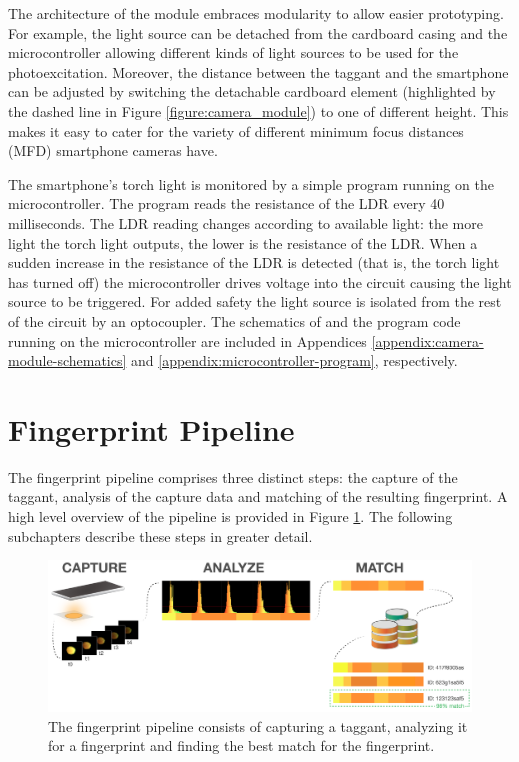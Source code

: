 \documentclass[thesis.tex]{subfiles}
\begin{document}
The architecture of the module embraces modularity to allow easier prototyping. For example, the light source can be detached from the cardboard casing and the microcontroller allowing different kinds of light sources to be used for the photoexcitation. Moreover, the distance between the taggant and the smartphone can be adjusted by switching the detachable cardboard element (highlighted by the dashed line in Figure \ref{figure:camera_module}) to one of different height. This makes it easy to cater for the variety of different minimum focus distances (MFD) smartphone cameras have.

The smartphone's torch light is monitored by a simple program running on the microcontroller. The program reads the resistance of the LDR every 40 milliseconds. The LDR reading changes according to available light: the more light the torch light outputs, the lower is the resistance of the LDR. When a sudden increase in the resistance of the LDR is detected (that is, the torch light has turned off) the microcontroller drives voltage into the circuit causing the light source to be triggered. For added safety the light source is isolated from the rest of the circuit by an optocoupler. The schematics of and the program code running on the microcontroller are included in Appendices \ref{appendix:camera-module-schematics} and \ref{appendix:microcontroller-program}, respectively.

\section{Fingerprint Pipeline}
\label{chapter:fingerprint-pipeline}

The fingerprint pipeline comprises three distinct steps: the capture of the taggant, analysis of the capture data and matching of the resulting fingerprint. A high level overview of the pipeline is provided in Figure \ref{figure:fingerprint-pipeline}. The following subchapters describe these steps in greater detail.

\begin{figure}[h]
\centering \includegraphics[width=\textwidth,height=\textheight,keepaspectratio=true]{images/design_implementation/fingerprint_pipeline.pdf}
\caption{The fingerprint pipeline consists of capturing a taggant, analyzing it for a fingerprint and finding the best match for the fingerprint. \label{figure:fingerprint-pipeline}}
\end{figure}
\end{document}

